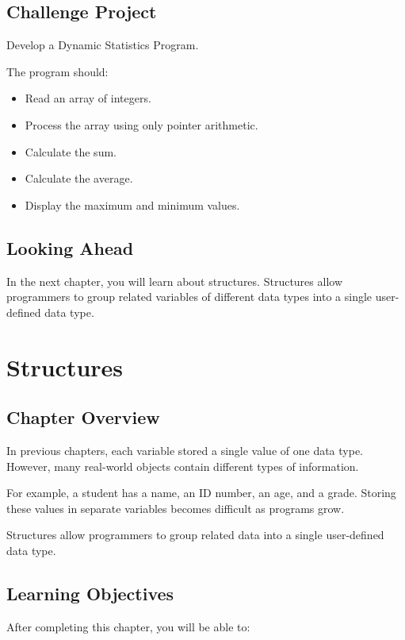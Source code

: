 \documentclass[12pt,openany]{book}
\begin{document}
\section{Challenge Project}

Develop a Dynamic Statistics Program.

The program should:

\begin{itemize}
    \item Read an array of integers.
    \item Process the array using only pointer arithmetic.
    \item Calculate the sum.
    \item Calculate the average.
    \item Display the maximum and minimum values.
\end{itemize}

\section{Looking Ahead}

In the next chapter, you will learn about structures. Structures allow programmers to group related variables of different data types into a single user-defined data type.
\chapter{Structures}

\section{Chapter Overview}

In previous chapters, each variable stored a single value of one data type. However, many real-world objects contain different types of information.

For example, a student has a name, an ID number, an age, and a grade. Storing these values in separate variables becomes difficult as programs grow.

Structures allow programmers to group related data into a single user-defined data type.

\section{Learning Objectives}

After completing this chapter, you will be able to:
\end{document}
